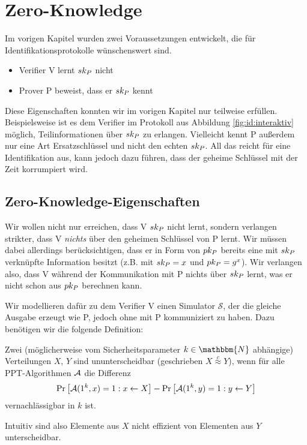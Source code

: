 \chapter{Zero-Knowledge}
Im vorigen Kapitel wurden zwei Voraussetzungen entwickelt, die für
Identifikationsprotokolle wünschenswert sind.
\begin{itemize}
  \item Verifier V lernt $sk_P$ nicht
  \item Prover P beweist, dass er $sk_P$ kennt
\end{itemize}
Diese Eigenschaften konnten wir im vorigen Kapitel nur teilweise
erfüllen. Beispielsweise ist es dem Verifier im Protokoll aus Abbildung
\ref{fig:id:interaktiv} möglich, Teilinformationen über $sk_P$ zu
erlangen. Vielleicht kennt P außerdem nur eine Art Ersatzschlüssel und
nicht den echten $sk_P$. All das reicht für eine Identifikation aus,
kann jedoch dazu führen, dass der geheime Schlüssel mit der Zeit
korrumpiert wird.

\section{Zero-Knowledge-Eigenschaften}
Wir wollen nicht nur erreichen, dass V $sk_P$ nicht lernt, sondern
verlangen strikter, dass V \emph{nichts} über den geheimen Schlüssel von
P lernt. Wir müssen dabei allerdings berücksichtigen, dass er in Form
von $pk_P$ bereits eine mit $sk_P$ verknüpfte Information besitzt
(z.B.  mit $sk_P = x$ und $pk_P = g^x$). Wir verlangen also, dass
V während der Kommunikation mit P nichts über $sk_P$ lernt, was er
nicht schon aus $pk_P$ berechnen kann.

Wir modellieren dafür zu dem Verifier V einen Simulator $\mathcal{S}$,
der die gleiche Ausgabe erzeugt wie P, jedoch ohne mit P kommuniziert zu
haben. Dazu benötigen wir die folgende Definition:
\begin{definition}\label{def:zk:ununterscheidbarkeit}
  Zwei (möglicherweise vom Sicherheitsparameter $k \in \mathbbm{N}$ abhängige) Verteilungen $X$, $Y$ sind ununterscheidbar (geschrieben $X
  \stackrel{c}\approx Y$), wenn für alle PPT-Algorithmen $\mathcal{A}$ die Differenz
  \[
    \Pr \left[ \mathcal{A}(1^k,x) = 1 : x \leftarrow X \right] - \Pr \left[ \mathcal{A}(1^k, y) = 1 : y \leftarrow Y \right]
  \]
  vernachlässigbar in $k$ ist.
\end{definition}
Intuitiv sind also Elemente aus $X$ nicht effizient von Elementen aus $Y$ unterscheidbar.


